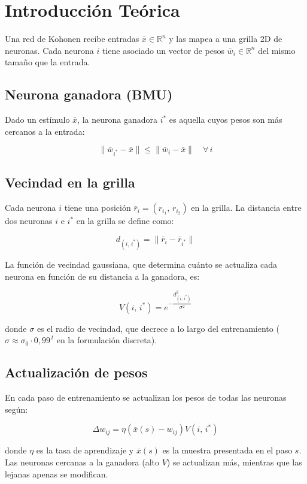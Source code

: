 \section{Introducción Teórica}

Una red de Kohonen recibe entradas $\bar{x} \in \mathbb{R}^n$ y las mapea a una grilla 2D de neuronas. Cada neurona $i$ tiene asociado un vector de pesos $\bar{w}_i \in \mathbb{R}^n$ del mismo tamaño que la entrada.

\subsection*{Neurona ganadora (BMU)}

Dado un estímulo $\bar{x}$, la neurona ganadora $i^*$ es aquella cuyos pesos son más cercanos a la entrada:

\begin{equation}
    \|\bar{w}_{i^*} - \bar{x}\| \leq \|\bar{w}_i - \bar{x}\| \quad \forall\, i
\end{equation}

\subsection*{Vecindad en la grilla}

Cada neurona $i$ tiene una posición $\bar{r}_i = (r_{i_1},\, r_{i_2})$ en la grilla. La distancia entre dos neuronas $i$ e $i^*$ en la grilla se define como:

\begin{equation}
    d_{(i,\,i^*)} = \|\bar{r}_i - \bar{r}_{i^*}\|
\end{equation}

La función de vecindad gaussiana, que determina cuánto se actualiza cada neurona en función de su distancia a la ganadora, es:

\begin{equation}
    V(i,\,i^*) = e^{-\dfrac{d^2_{(i,\,i^*)}}{\sigma^2}}
\end{equation}

donde $\sigma$ es el radio de vecindad, que decrece a lo largo del entrenamiento ($\sigma \approx \sigma_0 \cdot 0{,}99^{\,t}$ en la formulación discreta).

\subsection*{Actualización de pesos}

En cada paso de entrenamiento se actualizan los pesos de todas las neuronas según:

\begin{equation}
    \Delta w_{ij} = \eta \left(\bar{x}(s) - w_{ij}\right) V(i,\,i^*)
\end{equation}

donde $\eta$ es la tasa de aprendizaje y $\bar{x}(s)$ es la muestra presentada en el paso $s$. Las neuronas cercanas a la ganadora (alto $V$) se actualizan más, mientras que las lejanas apenas se modifican.
